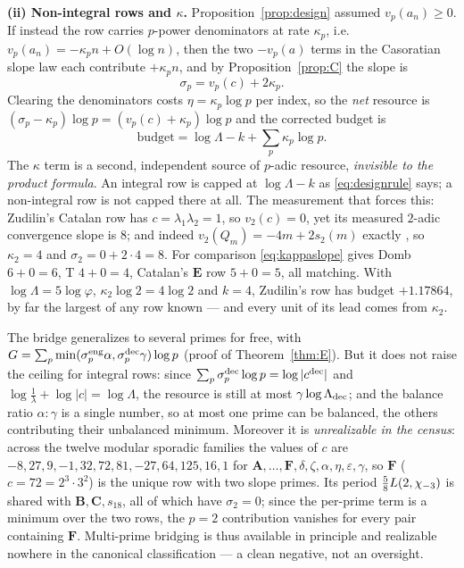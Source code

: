 \medskip
\noindent\textbf{(ii) Non-integral rows and $\kappa$.}  Proposition~\ref{prop:design}
assumed $v_p(a_n)\ge0$.  If instead the row carries $p$-power denominators at
rate $\kappa_p$, i.e.\ $v_p(a_n)=-\kappa_pn+O(\log n)$, then the two
$-v_p(a)$ terms in the Casoratian slope law each contribute $+\kappa_pn$, and
by Proposition~\ref{prop:C} the slope is
\begin{equation}\label{eq:kappaslope}
\sigma_p=v_p(c)+2\kappa_p .
\end{equation}
Clearing the denominators costs $\eta=\kappa_p\log p$ per index, so the
\emph{net} resource is $(\sigma_p-\kappa_p)\log p=(v_p(c)+\kappa_p)\log p$ and
the corrected budget is
\begin{equation}\label{eq:kappabudget}
\boxed{\ \text{budget}=\log\Lambda-k+\sum_p\kappa_p\log p .\ }
\end{equation}
The $\kappa$ term is a second, independent source of $p$-adic resource,
\emph{invisible to the product formula}.  An integral row is capped at
$\log\Lambda-k$ as \eqref{eq:designrule} says; a non-integral row is not capped
there at all.  The measurement that forces this: Zudilin's Catalan row has
$c=\lambda_1\lambda_2=1$, so $v_2(c)=0$, yet its measured $2$-adic convergence
slope is $8$; and indeed $v_2(Q_m)=-4m+2s_2(m)$ exactly
, so $\kappa_2=4$ and
$\sigma_2=0+2\cdot4=8$.  For comparison \eqref{eq:kappaslope} gives Domb
$6+0=6$, T $4+0=4$, Catalan's $\mathbf E$ row $5+0=5$, all matching.  With
$\log\Lambda=5\log\varphi$, $\kappa_2\log2=4\log2$ and $k=4$, Zudilin's row has
budget $+1.17864$, by far the largest of any row known --- and every unit of
its lead comes from $\kappa_2$.

\begin{remark}\label{rem:multiprime}
The bridge generalizes to several primes for free, with
$G=\sum_p\min(\sigma_p^{\rm eng}\alpha,\sigma_p^{\rm dec}\gamma)\log p$
(proof of Theorem~\ref{thm:E}).  But it does not raise the ceiling for integral
rows: since $\sum_p\sigma_p^{\rm dec}\log p=\log|c^{\rm dec}|$ and
$\log\tfrac1\lambda+\log|c|=\log\Lambda$, the resource is still at most
$\gamma\log\Lambda_{\rm dec}$; and the balance ratio $\alpha:\gamma$ is a
single number, so at most one prime can be balanced, the others contributing
their unbalanced minimum.  Moreover it is \emph{unrealizable in the census}:
across the twelve modular sporadic families the values of $c$ are
$-8,27,9,-1,32,72,81,-27,64,125,16,1$ for
$\mathbf A,\dots,\mathbf F,\delta,\zeta,\alpha,\eta,\varepsilon,\gamma$, so
$\mathbf F$ ($c=72=2^3\cdot3^2$) is the unique row with two slope primes.  Its
period $\tfrac58L(2,\chi_{-3})$ is shared with $\mathbf B,\mathbf C,s_{18}$, all
of which have $\sigma_2=0$; since the per-prime term is a minimum over the two
rows, the $p=2$ contribution vanishes for every pair containing $\mathbf F$.
Multi-prime bridging is thus available in principle and realizable nowhere in
the canonical classification --- a clean negative, not an oversight.
\end{remark}

